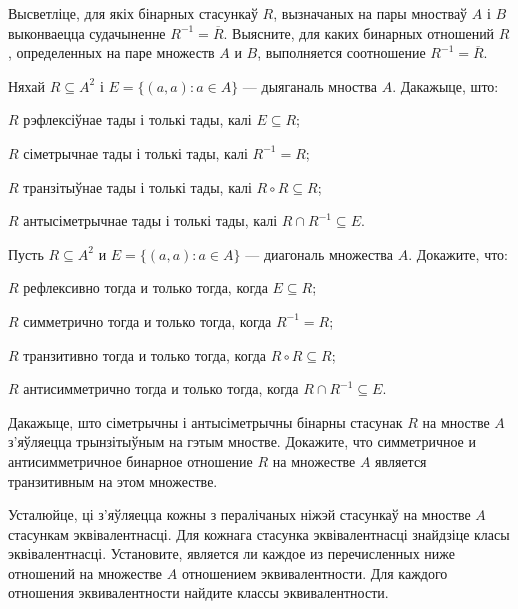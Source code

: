 \begin{problemList}
\problemItemSimple
{Высветліце, для якіх бінарных стасункаў $R$, вызначаных на пары мностваў $A$ і $B$ выконваецца судачыненне $R^{-1} = \overline{R}$.}
{Выясните, для каких бинарных отношений $R$, определенных на паре
множеств $A$ и $B$, выполняется соотношение $R^{-1} = \overline{R}$.}

\bigskip

\problemItemSimple
{%
Няхай $R \subseteq A^2$ і $E = \{(a, a) \colon a \in A\}$ --- дыяганаль мноства $A$. Дакажыце, што:
\begin{belarusianEnumerate}
	\item $R$ рэфлексіўнае тады і толькі тады, калі $E \subseteq R$;
	\item $R$ сіметрычнае тады і толькі тады, калі $R^{-1} = R$;
	\item $R$ транзітыўнае тады і толькі тады, калі $R \circ R \subseteq R$;
	\item $R$ антысіметрычнае тады і толькі тады, калі $R \cap R^{-1} \subseteq E$.
\end{belarusianEnumerate}
\textbf{}
\vspace{-1.5em}
}
{%
Пусть $R \subseteq A^2$ и $E = \{(a, a) \colon a \in A\}$ --- диагональ множества $A$. Докажите, что:
\begin{russianEnumerate}
	\item $R$ рефлексивно тогда и только тогда, когда $E \subseteq R$;
	\item $R$ симметрично тогда и только тогда, когда $R^{-1} = R$;
	\item $R$ транзитивно тогда и только тогда, когда $R \circ R \subseteq R$;
	\item $R$ антисимметрично тогда и только тогда, когда $R \cap R^{-1} \subseteq E$.
\end{russianEnumerate}
}

\bigskip

\problemItemSimple
{Дакажыце, што сіметрычны і антысіметрычны бінарны стасунак $R$ на мностве $A$ з'яўляецца трынзітыўным на гэтым мностве.}
{Докажите, что симметричное и антисимметричное бинарное отношение $R$ на множестве $A$ является транзитивным на этом множестве.}

\bigskip

\problemItemWithCommonPart
{Усталюйце, ці з'яўляецца кожны з пералічаных ніжэй стасункаў на мностве $A$ стасункам эквівалентнасці. Для кожнага стасунка эквівалентнасці знайдзіце класы эквівалентнасці.}
{Установите, является ли каждое из перечисленных ниже отношений на множестве $A$ отношением эквивалентности. Для каждого отношения эквивалентности найдите классы эквивалентности.}
{%
\begin{belarusianEnumerate}
	

\end{belarusianEnumerate}}
\end{problemList}
